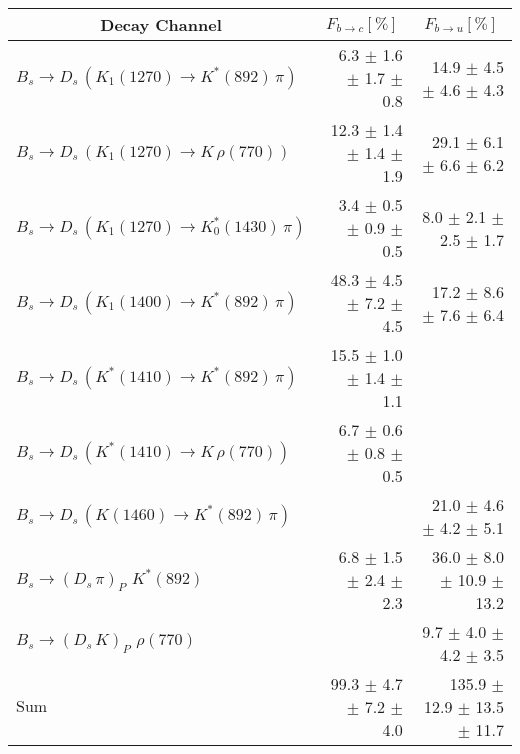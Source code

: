 \begin{tabular}{l r r } 
\hline
\hline
\multicolumn{1}{c}{Decay Channel} & \multicolumn{1}{c}{$F_{b \to c} [\%]$} & \multicolumn{1}{c}{$F_{b \to u} [\%]$}  \\ 
\hline
$B_s \to D_s \, ( K_1(1270) \to K^{*}(892) \, \pi )$ & 6.3 $\pm$ 1.6 $\pm$ 1.7 $\pm$ 0.8 & 14.9 $\pm$ 4.5 $\pm$ 4.6 $\pm$ 4.3 \\ 
$B_s \to D_s \, ( K_1(1270) \to K \, \rho(770) )$ & 12.3 $\pm$ 1.4 $\pm$ 1.4 $\pm$ 1.9 & 29.1 $\pm$ 6.1 $\pm$ 6.6 $\pm$ 6.2 \\ 
$B_s \to D_s \, ( K_1(1270) \to K^{*}_{0}(1430) \, \pi )$ & 3.4 $\pm$ 0.5 $\pm$ 0.9 $\pm$ 0.5 & 8.0 $\pm$ 2.1 $\pm$ 2.5 $\pm$ 1.7 \\ 
$B_s \to D_s \, ( K_1(1400) \to K^{*}(892) \, \pi )$ & 48.3 $\pm$ 4.5 $\pm$ 7.2 $\pm$ 4.5 & 17.2 $\pm$ 8.6 $\pm$ 7.6 $\pm$ 6.4 \\ 
$B_s \to D_s \, ( K^{*}(1410) \to K^{*}(892) \, \pi )$ & 15.5 $\pm$ 1.0 $\pm$ 1.4 $\pm$ 1.1 &  \\ 
$B_s \to D_s \, ( K^{*}(1410) \to K \, \rho(770) )$ & 6.7 $\pm$ 0.6 $\pm$ 0.8 $\pm$ 0.5 &  \\ 
$B_s \to D_s \, ( K(1460) \to K^{*}(892) \, \pi )$ &  & 21.0 $\pm$ 4.6 $\pm$ 4.2 $\pm$ 5.1 \\ 
$B_s \to ( D_s \, \pi)_{P} \, \, K^{*}(892)$ & 6.8 $\pm$ 1.5 $\pm$ 2.4 $\pm$ 2.3 & 36.0 $\pm$ 8.0 $\pm$ 10.9 $\pm$ 13.2 \\ 
$B_s \to ( D_s \, K)_{P} \, \, \rho(770)$ &  & 9.7 $\pm$ 4.0 $\pm$ 4.2 $\pm$ 3.5 \\ 
\hline
$\text{Sum}$ & 99.3 $\pm$ 4.7 $\pm$ 7.2 $\pm$ 4.0 & 135.9 $\pm$ 12.9 $\pm$ 13.5 $\pm$ 11.7 \\ 
\hline
\hline
\end{tabular}
